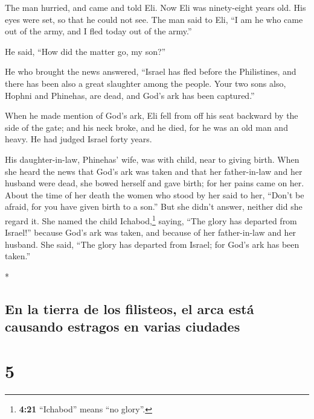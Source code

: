 \begin{paracol}{2}
\begin{otherlanguage}{english}
The man hurried, and came and told Eli.  Now Eli was
ninety-eight years old. His eyes were set, so that he could not see.
 The man said to Eli, ``I am he who came out of the army,
and I fled today out of the army.''

He said, ``How did the matter go, my son?''

 He who brought the news answered, ``Israel has fled
before the Philistines, and there has been also a great slaughter among
the people. Your two sons also, Hophni and Phinehas, are dead, and God's
ark has been captured.''

 When he made mention of God's ark, Eli fell from off his
seat backward by the side of the gate; and his neck broke, and he died,
for he was an old man and heavy. He had judged Israel forty years.

 His daughter-in-law, Phinehas' wife, was with child,
near to giving birth. When she heard the news that God's ark was taken
and that her father-in-law and her husband were dead, she bowed herself
and gave birth; for her pains came on her.  About the
time of her death the women who stood by her said to her, ``Don't be
afraid, for you have given birth to a son.'' But she didn't answer,
neither did she regard it.  She named the child
Ichabod,\footnote{\textbf{4:21} ``Ichabod'' means ``no glory''.} saying,
``The glory has departed from Israel!'' because God's ark was taken, and
because of her father-in-law and her husband.  She said,
``The glory has departed from Israel; for God's ark has been taken.''

\end{otherlanguage}

\switchcolumn[0]*

\hypertarget{en-la-tierra-de-los-filisteos-el-arca-estuxe1-causando-estragos-en-varias-ciudades}{%
\subsection{En la tierra de los filisteos, el arca está causando
estragos en varias
ciudades}\label{en-la-tierra-de-los-filisteos-el-arca-estuxe1-causando-estragos-en-varias-ciudades}}

\hypertarget{section-8}{%
\section{5}\label{section-8}}


\end{paracol}
